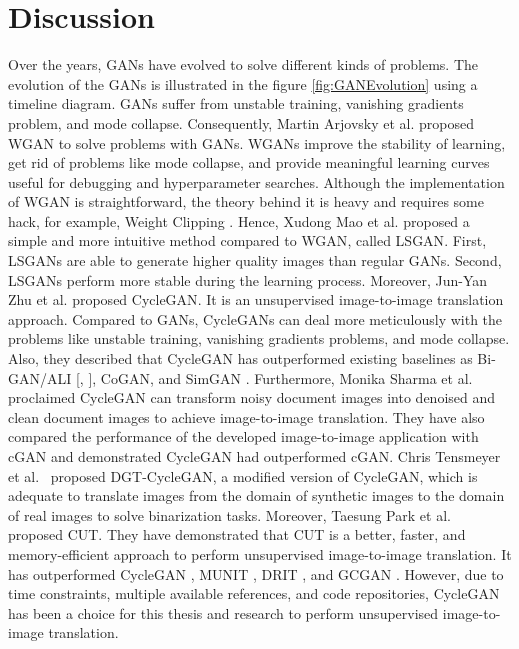 \section{Discussion}\label{rwdiscussion}
Over the years, \acp{GAN} have evolved to solve different kinds of problems. The evolution of the \acp{GAN} is illustrated in the figure \ref{fig:GANEvolution} using a timeline diagram. \acp{GAN} suffer from unstable training, vanishing gradients problem, and mode collapse. Consequently, Martin Arjovsky et al.\cite{arjovsky2017wasserstein} proposed \ac{WGAN} to solve problems with \acp{GAN}. \acp{WGAN} improve the stability of learning, get rid of problems like mode collapse, and provide meaningful learning curves useful for debugging and hyperparameter searches. Although the implementation of \ac{WGAN} is straightforward, the theory behind it is heavy and requires some hack, for example, Weight Clipping  \cite{gulrajani2017improved}. Hence, Xudong Mao et al.\cite{mao2017squares} proposed a simple and more intuitive method compared to \ac{WGAN}, called \ac{LSGAN}. First, \acp{LSGAN} are able to generate higher quality images than regular \acp{GAN}. Second, \acp{LSGAN} perform more stable during the learning process. Moreover, Jun-Yan Zhu et al.\cite{zhu2020unpaired} proposed \ac{CycleGAN}. It is an unsupervised image-to-image translation approach. Compared to \acp{GAN}, \acp{CycleGAN} can deal more meticulously with the problems like unstable training, vanishing gradients problems, and mode collapse. Also, they described that \ac{CycleGAN} has outperformed existing baselines as Bi-GAN/ALI [\cite{donahue2017adversarial}, \cite{dumoulin2017adversarially}], CoGAN\cite{liu2016coupled}, and SimGAN \cite{shrivastava2017learning}. Furthermore, Monika Sharma et al.\cite{sharma2019learning} proclaimed  \ac{CycleGAN} can transform noisy document images into denoised and clean document images to achieve image-to-image translation. They have also compared the performance of the developed image-to-image application with \ac{cGAN} and demonstrated \ac{CycleGAN} had outperformed \ac{cGAN}. Chris Tensmeyer et al.\ \cite{8978087} proposed DGT-CycleGAN, a modified version of \ac{CycleGAN}, which is adequate to translate images from the domain of synthetic images to the domain of real images to solve binarization tasks. Moreover, Taesung Park et al.\ \cite{park2020contrastive} proposed \ac{CUT}. They have demonstrated that \ac{CUT} is a better, faster, and memory-efficient approach to perform unsupervised image-to-image translation. It has outperformed \ac{CycleGAN} \cite{zhu2020unpaired}, \ac{MUNIT} \cite{liu2018unsupervised}, \ac{DRIT} \cite{lee2019drit}, and \ac{GCGAN} \cite{fu2018geometryconsistent}. However, due to time constraints, multiple available references, and code repositories, \ac{CycleGAN} has been a choice for this thesis and research to perform unsupervised image-to-image translation.


